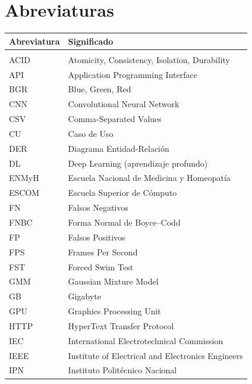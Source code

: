 
\chapter*{Abreviaturas}

\begin{longtable}{@{}p{3.2cm}p{10.8cm}@{}}
\textbf{Abreviatura} & \textbf{Significado} \\[4pt]
\hline \\[-6pt]
\endhead

ACID     & Atomicity, Consistency, Isolation, Durability \\[2pt]
API      & Application Programming Interface \\[2pt]
BGR      & Blue, Green, Red \\[2pt]
CNN      & Convolutional Neural Network \\[2pt]
CSV      & Comma-Separated Values \\[2pt]
CU       & Caso de Uso \\[2pt]
DER      & Diagrama Entidad-Relación \\[2pt]
DL       & Deep Learning (aprendizaje profundo) \\[2pt]
ENMyH    & Escuela Nacional de Medicina y Homeopatía \\[2pt]
ESCOM    & Escuela Superior de Cómputo \\[2pt]
FN       & Falsos Negativos \\[2pt]
FNBC     & Forma Normal de Boyce--Codd \\[2pt]
FP       & Falsos Positivos \\[2pt]
FPS      & Frames Per Second \\[2pt]
FST      & Forced Swim Test \\[2pt]
GMM      & Gaussian Mixture Model \\[2pt]
GB       & Gigabyte \\[2pt]
GPU      & Graphics Processing Unit \\[2pt]
HTTP     & HyperText Transfer Protocol \\[2pt]
IEC      & International Electrotechnical Commission \\[2pt]
IEEE     & Institute of Electrical and Electronics Engineers \\[2pt]
IPN      & Instituto Politécnico Nacional \\[2pt]

\end{longtable}
